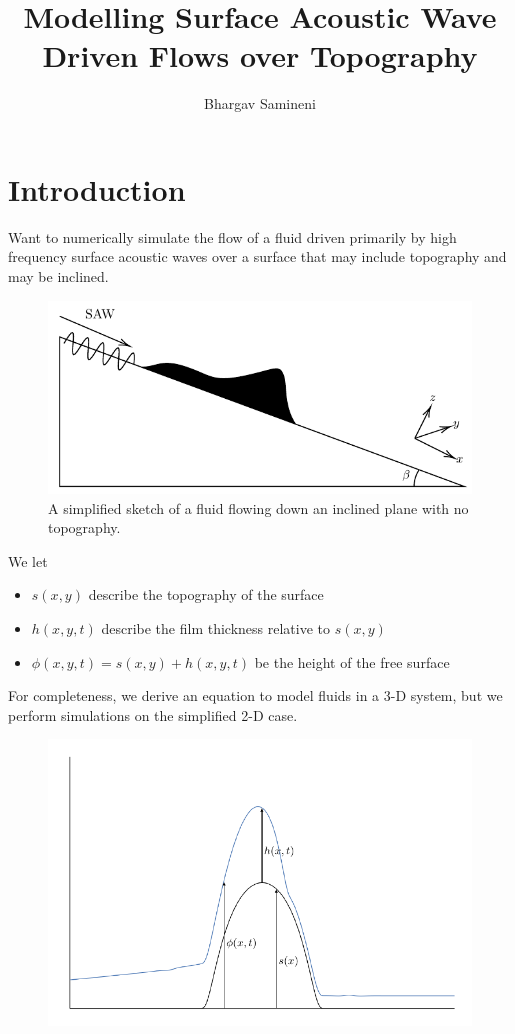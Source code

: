 \documentclass[compress, xcolor=dvipsnames]{beamer}
\title{Modelling Surface Acoustic Wave Driven Flows over Topography}
\author{Bhargav Samineni}
\newcommand{\func}[2]{\ensuremath{#1\!\lrp{#2}}}
\newcommand{\lrp}[1]{\left( #1 \right)}
\begin{document}
   
    \frame{\titlepage}     

    \section{Introduction}
    \begin{frame}
        Want to numerically simulate the flow of a fluid driven primarily by 
        high frequency surface acoustic waves over a surface that may include topography
        and may be inclined. 

        \begin{figure}[hb]
            \centering
            \includegraphics[width=.75\textwidth]{images/samp_diagram.pdf}
            \caption{A simplified sketch of a fluid flowing down an inclined plane with no topography.}
            \label{fig:model_diagram}
        \end{figure}
    \end{frame}
    \begin{frame} 
        We let
        \begin{itemize}
            \item $\func{s}{x, y}$ describe the topography of the surface
            \item $\func{h}{x,y,t}$ describe the film thickness relative to $\func{s}{x,y}$ 
            \item $\func{\phi}{x,y,t} = \func{s}{x,y} + \func{h}{x,y,t}$ be the height of the free surface
        \end{itemize}

        For completeness, we derive an equation to model fluids in a 
        3-D system, but we perform simulations on the simplified 2-D case. 
        \begin{figure}
            \centering
            \includegraphics[width=.6\textwidth]{images/funcs_diagram.pdf}
        \end{figure}
    \end{frame}
    
    
    
\end{document}

